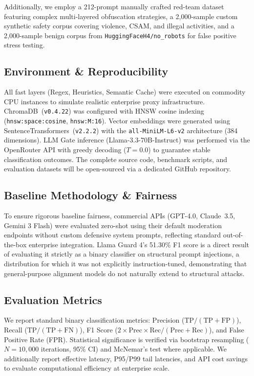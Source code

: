 \documentclass[conference]{IEEEtran}
\begin{document}
Additionally, we employ a 212-prompt manually crafted red-team
dataset featuring complex multi-layered obfuscation strategies, a
2{,}000-sample custom synthetic safety corpus covering violence,
CSAM, and illegal activities, and a 2{,}000-sample benign corpus
from \texttt{HuggingFaceH4/no\_robots} for false positive stress
testing.

\subsection{Environment \& Reproducibility}

All fast layers (Regex, Heuristics, Semantic Cache) were executed on
commodity CPU instances to simulate realistic enterprise proxy
infrastructure. ChromaDB~(\texttt{v0.4.22}) was configured with HNSW
cosine indexing (\texttt{hnsw:space:cosine}, \texttt{hnsw:M:16}).
Vector embeddings were generated using
SentenceTransformers~(\texttt{v2.2.2}) with the
\texttt{all-MiniLM-L6-v2} architecture (384 dimensions). LLM Gate
inference (Llama-3.3-70B-Instruct) was performed via the OpenRouter
API with greedy decoding ($T{=}0.0$) to guarantee stable
classification outcomes. The complete source code, benchmark scripts,
and evaluation datasets will be open-sourced via a dedicated GitHub
repository.

\subsection{Baseline Methodology \& Fairness}
To ensure rigorous baseline fairness, commercial APIs (GPT-4.0, Claude~3.5, Gemini 3 Flash) were evaluated zero-shot using their default moderation endpoints without custom defensive system prompts, reflecting standard out-of-the-box enterprise integration. Llama Guard 4's 51.30\% F1 score is a direct result of evaluating it strictly as a binary classifier on structural prompt injections, a distribution for which it was not explicitly instruction-tuned, demonstrating that general-purpose alignment models do not naturally extend to structural attacks.

\subsection{Evaluation Metrics}

We report standard binary classification metrics: Precision
($\text{TP}/(\text{TP}+\text{FP})$), Recall
($\text{TP}/(\text{TP}+\text{FN})$), F1 Score
($2 \times \text{Prec} \times \text{Rec} / (\text{Prec} +
\text{Rec})$), and False Positive Rate (FPR). Statistical
significance is verified via bootstrap resampling ($N{=}10{,}000$
iterations, 95\% CI) and McNemar's test where applicable. We
additionally report effective latency, P95/P99 tail latencies, and
API cost savings to evaluate computational efficiency at enterprise
scale.
\end{document}
